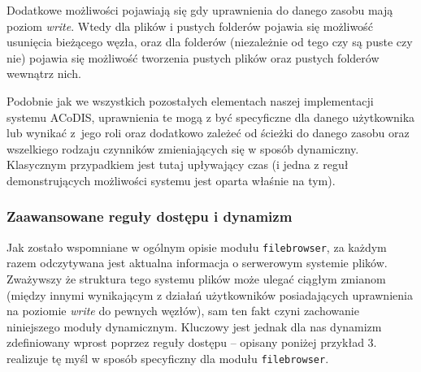 \documentclass{classrep}
\begin{document}
Dodatkowe możliwości pojawiają się gdy uprawnienia do danego zasobu mają poziom \emph{write}.
Wtedy dla plików i pustych folderów pojawia się możliwość usunięcia bieżącego węzła,
oraz dla folderów (niezależnie od tego czy są puste czy nie) pojawia się możliwość
tworzenia pustych plików oraz pustych folderów wewnątrz nich.

\vspace\baselineskip

Podobnie jak we wszystkich pozostałych elementach naszej implementacji systemu ACoDIS, uprawnienia
te mogą z być specyficzne dla danego użytkownika lub wynikać z~jego roli oraz dodatkowo
zależeć od ścieżki do danego zasobu oraz wszelkiego rodzaju czynników zmieniających
się w sposób dynamiczny. Klasycznym przypadkiem jest tutaj upływający czas (i jedna z reguł
demonstrujących możliwości systemu jest oparta właśnie na tym).

\vspace\baselineskip

\subsubsection{Zaawansowane reguły dostępu i dynamizm}

Jak zostało wspomniane w ogólnym opisie modułu \texttt{filebrowser}, za każdym
razem odczytywana jest aktualna informacja o serwerowym systemie plików.
Zważywszy że struktura tego systemu plików może ulegać ciągłym zmianom
(między innymi wynikającym z działań użytkowników posiadających uprawnienia
na poziomie \emph{write} do pewnych węzłów), sam ten fakt czyni zachowanie
niniejszego moduły dynamicznym. Kluczowy jest jednak dla nas dynamizm
zdefiniowany wprost poprzez reguły dostępu -- opisany poniżej przykład 3. realizuje
tę myśl w sposób specyficzny dla modułu \texttt{filebrowser}.

\vspace\baselineskip
\end{document}
